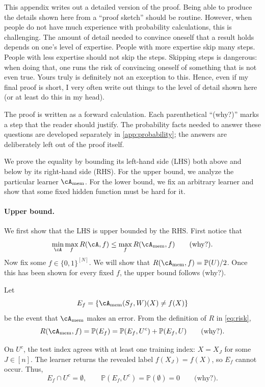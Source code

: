 \documentclass[11pt,twoside]{article}
\renewcommand{\P}{\mathbb P}
\newcommand{\cAmem}{\cA_{\mathrm{mem}}}
\theoremstyle{definition}
\theoremstyle{remark}
\begin{document}
This appendix writes out a detailed version of the proof. Being able to
produce the details shown here from a ``proof sketch'' should be routine.
However, when people do not have much
experience with probability calculations, this is challenging. The amount of
detail needed to convince oneself that a result holds depends on one's level
of expertise. People with more expertise skip many steps. People with less
expertise should not skip the steps. Skipping steps is dangerous: when doing
that, one runs the risk of convincing oneself of something that is not even
true. Yours truly is definitely not an exception to this. Hence, even if my
final proof is short, I very often write out things to the level of detail
shown here (or at least do this in my head).

The proof is written as a forward calculation. Each parenthetical ``(why?)''
marks a step that the reader should justify. The probability facts needed to
answer these questions are developed separately in
\cref{app:probability}; the answers are deliberately left out of the
proof itself.

We prove the equality by bounding its left-hand side (LHS) both above and
below by its right-hand side (RHS).
For the upper bound, we analyze the particular learner $\cAmem$. For the lower
bound, we fix an arbitrary learner and show that some fixed hidden function
must be hard for it.

\paragraph{Upper bound.}
We first show that the LHS is upper bounded by the RHS. First notice that
\[
\min_{\cA}\max_f R(\cA,f)
\le \max_f R(\cAmem,f)
\qquad\text{(why?).}
\]
Now fix some $f\in\{0,1\}^{[N]}$. We will show that
$R(\cAmem,f)=\P(U)/2$. Once this has been shown for every fixed $f$, the upper
bound follows (why?).

Let
\[
E_f=\{\cAmem(S_f,W)(X)\ne f(X)\}
\]
be the event that $\cAmem$ makes an error. From the definition of $R$ in
\cref{eq:risk},
\[
R(\cAmem,f)
=\P(E_f)
=\P(E_f,U^c)+\P(E_f,U)
\qquad\text{(why?).}
\]

On $U^c$, the test index agrees with at least one training index: $X=X_J$ for
some $J\in[n]$. The learner returns the revealed label
$f(X_J)=f(X)$, so $E_f$ cannot occur. Thus,
\[
E_f\cap U^c=\emptyset,
\qquad
\P(E_f,U^c)=\P(\emptyset)=0
\qquad\text{(why?).}
\]
\end{document}
